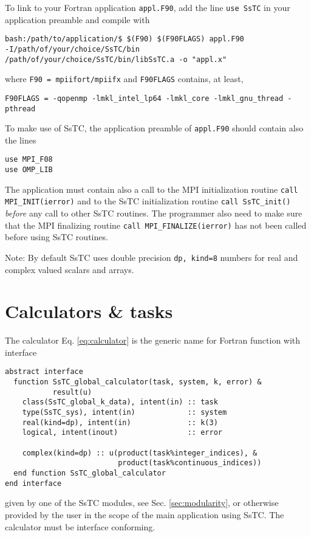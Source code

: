 \documentclass[10pt,a4paper]{article}
\begin{document}
To link to your Fortran application \verb|appl.F90|, add the line \verb|use SsTC| in your application preamble and compile with 
\begin{verbatim}
bash:/path/to/application/$ $(F90) $(F90FLAGS) appl.F90 
-I/path/of/your/choice/SsTC/bin 
/path/of/your/choice/SsTC/bin/libSsTC.a -o "appl.x"
\end{verbatim}
where \verb|F90 = mpiifort/mpiifx| and \verb|F90FLAGS| contains, at least,
\begin{verbatim}
F90FLAGS = -qopenmp -lmkl_intel_lp64 -lmkl_core -lmkl_gnu_thread -pthread
\end{verbatim}

To make use of SsTC, the application preamble of \verb|appl.F90| should contain also the lines 
\begin{verbatim}
use MPI_F08
use OMP_LIB
\end{verbatim}
The application must contain also a call to the MPI \cite{messagepassinginterfaceforumMPIMessagePassingInterface2021} initialization routine \verb|call MPI_INIT(ierror)| and to the SsTC initialization routine \verb|call SsTC_init()| \textit{before} any call to other SsTC routines. The programmer also need to make sure that the MPI finalizing routine \verb|call MPI_FINALIZE(ierror)| has not been called before using SsTC routines.

Note:  By default SsTC uses double precision \verb|dp, kind=8| numbers for real and complex valued scalars and arrays.

\section{Calculators \& tasks}
The calculator Eq. \eqref{eq:calculator} is the generic name for Fortran function with interface
\begin{lstlisting}[caption={Interface of a general calculator.},captionpos=b, label={lst:interface_g_calc}]
abstract interface
  function SsTC_global_calculator(task, system, k, error) &
           result(u)
    class(SsTC_global_k_data), intent(in) :: task
    type(SsTC_sys), intent(in)            :: system
    real(kind=dp), intent(in)             :: k(3)
    logical, intent(inout)                :: error

    complex(kind=dp) :: u(product(task%integer_indices), &
                          product(task%continuous_indices))
  end function SsTC_global_calculator
end interface
\end{lstlisting}
given by one of the SsTC modules, see Sec. \ref{sec:modularity}, or otherwise provided by the user in the scope of the main application using SsTC. The calculator must be interface conforming.
\end{document}
